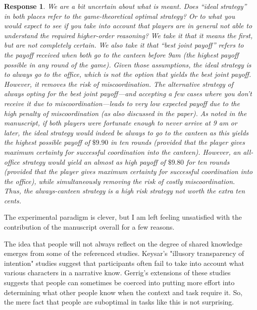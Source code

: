 \documentclass[a4paper]{article}
\newtheorem{response}{Response}
\begin{document}
\begin{response} 
We are a bit uncertain about what is meant. Does ``ideal strategy'' in both places refer to the game-theoretical optimal strategy? Or to what you would expect to see if you take into account that players are in general not able to understand the required higher-order reasoning? We take it that it means the first, but are not completely certain. We also take it that ``best joint payoff'' refers to the payoff received when both go to the canteen before 9am (the highest payoff possible in any round of the game). Given those assumptions, the ideal strategy is to always go to the office, which is \emph{not} the option that yields the best joint payoff.  However, it removes the risk of miscoordination. The alternative strategy of always opting for the best joint payoff---and accepting a few cases where you don't receive it due to miscoordination---leads to very low expected payoff due to the high penalty of miscoordination (as also discussed in the paper). As noted in the manuscript, if both players were fortunate enough to never arrive at 9 am or later, the ideal strategy would indeed be always to go to the canteen as this yields the highest possible payoff of $\$9.90$ in ten rounds (provided that the player gives maximum certainty for successful coordination into the canteen). However, an all-office strategy would yield an almost as high payoff of $\$9.80$ for ten rounds (provided that the player gives maximum certainty for successful coordination into the office), while simultaneously removing the risk of costly miscoordination. Thus, the always-canteen strategy is a high risk strategy not worth the extra ten cents.
\end{response}

The experimental paradigm is clever, but I am left feeling unsatisfied with the contribution of the manuscript overall for a few reasons.

The idea that people will not always reflect on the degree of shared knowledge emerges from some of the referenced studies. Keysar's "illusory transparency of intention" studies suggest that participants often fail to take into account what various characters in a narrative know. Gerrig's extensions of these studies suggests that people can sometimes be coerced into putting more effort into determining what other people know when the context and task require it. So, the mere fact that people are suboptimal in tasks like this is not surprising.
\end{document}
